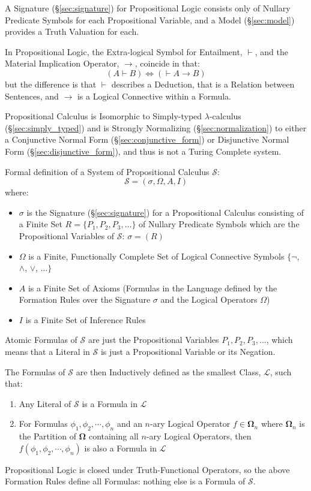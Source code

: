 A Signature (\S\ref{sec:signature}) for Propositional Logic consists
only of Nullary Predicate Symbols for each Propositional Variable, and
a Model (\S\ref{sec:model}) provides a Truth Valuation for each.

In Propositional Logic, the Extra-logical Symbol for Entailment,
$\vdash$, and the Material Implication Operator, $\rightarrow$,
coincide in that:
\[
  (A \vdash B) \Leftrightarrow (\vdash A \rightarrow B)
\]
but the difference is that $\vdash$ describes a Deduction, that is a
Relation between Sentences, and $\rightarrow$ is a Logical Connective
within a Formula.

Propositional Calculus is Isomorphic to Simply-typed
$\lambda$-calculus (\S\ref{sec:simply_typed}) and is Strongly
Normalizing (\S\ref{sec:normalization}) to either a Conjunctive Normal
Form (\S\ref{sec:conjunctive_form}) or Disjunctive Normal Form
(\S\ref{sec:disjunctive_form}), and thus is not a Turing Complete
system.

Formal definition of a System of Propositional Calculus $\mathcal{S}$:
\[
    \mathcal{S} = (\sigma, \Omega, A, I)
\]
where:
\begin{itemize}
  \item $\sigma$ is the Signature (\S\ref{sec:signature}) for a
    Propositional Calculus consisting of a Finite Set $R = \{P_1, P_2,
    P_3, \ldots\}$ of Nullary Predicate Symbols which are the
    Propositional Variables of $\mathcal{S}$: $\sigma = (R)$
  \item $\Omega$ is a Finite, Functionally Complete Set of Logical
    Connective Symbols $\{\neg$, $\wedge$, $\vee$, $\ldots\}$
  \item $A$ is a Finite Set of Axioms (Formulas in the Language defined
    by the Formation Rules over the Signature $\sigma$ and the Logical
    Operators $\Omega$)
  \item $I$ is a Finite Set of Inference Rules
\end{itemize}
Atomic Formulas of $\mathcal{S}$ are just the Propositional Variables
$P_1, P_2, P_3, \ldots$, which means that a Literal in $\mathcal{S}$
is just a Propositional Variable or its Negation.

The Formulas of $\mathcal{S}$ are then Inductively defined as the
smallest Class, $\mathcal{L}$, such that:
\begin{enumerate}
  \item Any Literal of $\mathcal{S}$ is a Formula in $\mathcal{L}$
  \item For Formulas $\phi_1, \phi_2, \cdots, \phi_n$ and an $n$-ary
    Logical Operator $f \in \mathbf{\Omega}_n$ where $\mathbf{\Omega}_n$
    is the Partition of $\mathbf{\Omega}$ containing all $n$-ary Logical
    Operators, then $f(\phi_1, \phi_2, \cdots, \phi_n)$ is also a
    Formula in $\mathcal{L}$
\end{enumerate}
Propositional Logic is closed under Truth-Functional Operators, so the
above Formation Rules define all Formulas: nothing else is a Formula
of $\mathcal{S}$.

